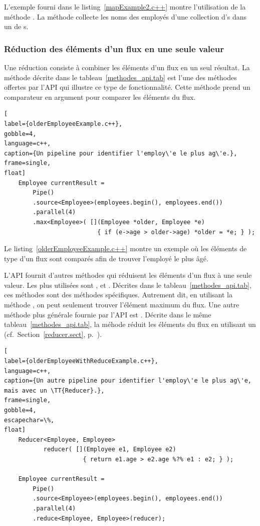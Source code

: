 L'exemple fourni dans le listing~\ref{mapExample2.c++} montre l'utilisation de la m\'ethode . La m\'ethode collecte les noms des employ\'es d'une collection d's dans un  de s.


\subsubsection{R\'eduction des \'el\'ements d'un flux en une seule valeur}

Une r\'eduction
consiste \`a combiner les \'el\'ements d'un flux en un seul r\'esultat. La m\'ethode  d\'ecrite dans le tableau~\ref{methodes_api.tab} est l'une des m\'ethodes offertes par l'{API} qui illustre ce type de fonctionnalit\'e. Cette m\'ethode prend un comparateur en argument pour comparer les \'el\'ements du flux. 

\begin{lstlisting}[
label={olderEmployeeExample.c++},
gobble=4,
language=c++,
caption={Un pipeline pour identifier l'employ\'e le plus ag\'e.},
frame=single,
float]
    Employee currentResult = 
        Pipe()
        .source<Employee>(employees.begin(), employees.end())
        .parallel(4)
        .max<Employee>( [](Employee *older, Employee *e) 
                          { if (e->age > older->age) *older = *e; } );
\end{lstlisting}



Le listing~\ref{olderEmployeeExample.c++} montre un exemple o\`u les \'el\'ements de type  d'un flux sont compar\'es afin de trouver l'employ\'e le plus \^ag\'e.


L'{API} fournit d'autres m\'ethodes qui r\'eduisent les \'el\'ements d'un flux \`a une seule valeur. Les plus utilis\'ees sont ,  et . D\'ecrites dans le tableau~\ref{methodes_api.tab}, ces m\'ethodes sont des m\'ethodes sp\'ecifiques. Autrement dit, en utilisant la m\'ethode , on peut seulement trouver l'\'el\'ement maximum du flux. Une autre m\'ethode plus g\'en\'erale fournie par l'{API} est . D\'ecrite dans le m\^eme tableau~\ref{methodes_api.tab}, la m\'ehode  r\'eduit les \'el\'ements du flux en utilisant un  (cf.~Section~\ref{reducer.sect}, p.~\pageref{reducer.sect}). 


\begin{lstlisting}[
label={olderEmployeeWithReduceExample.c++},
language=c++,
caption={Un autre pipeline pour identifier l'employ\'e le plus ag\'e, mais avec un \TT{Reducer}.},
frame=single,
gobble=4,
escapechar=\%,
float]
    Reducer<Employee, Employee> 
           reducer( [](Employee e1, Employee e2) 
                      { return e1.age > e2.age %?% e1 : e2; } );

    Employee currentResult =
        Pipe()
        .source<Employee>(employees.begin(), employees.end())
        .parallel(4)
        .reduce<Employee, Employee>(reducer);
\end{lstlisting}





